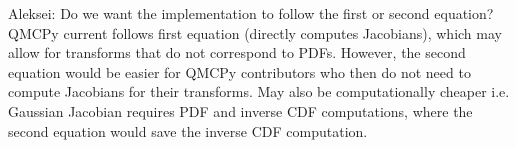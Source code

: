 \documentclass[graybox,footinfo]{svmult}
\newcommand{\AGSComment}[1]{{\color{cyan} Aleksei: #1}}
\begin{document}
\AGSComment{Do we want the implementation to follow the first or second equation? QMCPy current follows first equation (directly computes Jacobians), which may allow for transforms that do not correspond to PDFs. However, the second equation would be easier for QMCPy contributors who then do not need to compute Jacobians for their transforms. May also be computationally cheaper i.e. Gaussian Jacobian requires PDF and inverse CDF computations, where the second equation would save the inverse CDF computation.}

\fi 
\end{document}
